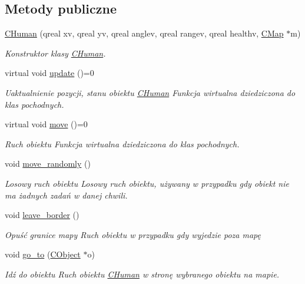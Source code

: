 \subsection*{Metody publiczne}
\begin{DoxyCompactItemize}
\item 
\mbox{\hyperlink{class_c_human_ac22428a4cdaa94ce6b238d690caa8406}{C\+Human}} (qreal xv, qreal yv, qreal anglev, qreal rangev, qreal healthv, \mbox{\hyperlink{class_c_map}{C\+Map}} $\ast$m)
\begin{DoxyCompactList}\small\item\em Konstruktor klasy \mbox{\hyperlink{class_c_human}{C\+Human}}. \end{DoxyCompactList}\item 
virtual void \mbox{\hyperlink{class_c_human_adb7f7d855ace82f7517bb49f465ea5d9}{update}} ()=0
\begin{DoxyCompactList}\small\item\em Uaktualnienie pozycji, stanu obiektu \mbox{\hyperlink{class_c_human}{C\+Human}} Funkcja wirtualna dziedziczona do klas pochodnych. \end{DoxyCompactList}\item 
virtual void \mbox{\hyperlink{class_c_human_af0a61dfcb43e2d094ab66b29735c4424}{move}} ()=0
\begin{DoxyCompactList}\small\item\em Ruch obiektu Funkcja wirtualna dziedziczona do klas pochodnych. \end{DoxyCompactList}\item 
void \mbox{\hyperlink{class_c_human_a3f334a1258957bac162181664212cfcf}{move\+\_\+randomly}} ()
\begin{DoxyCompactList}\small\item\em Losowy ruch obiektu Losowy ruch obiektu, używany w przypadku gdy obiekt nie ma żadnych zadań w danej chwili. \end{DoxyCompactList}\item 
void \mbox{\hyperlink{class_c_human_a57cd3a5b7922a03d67d4d04af355b332}{leave\+\_\+border}} ()
\begin{DoxyCompactList}\small\item\em Opuść granice mapy Ruch obiektu w przypadku gdy wyjedzie poza mapę \end{DoxyCompactList}\item 
void \mbox{\hyperlink{class_c_human_abb7c1d1fe27f3509364a9e727e315d74}{go\+\_\+to}} (\mbox{\hyperlink{class_c_object}{C\+Object}} $\ast$o)
\begin{DoxyCompactList}\small\item\em Idź do obiektu Ruch obiektu \mbox{\hyperlink{class_c_human}{C\+Human}} w stronę wybranego obiektu na mapie. \end{DoxyCompactList}\item 

\end{DoxyCompactItemize}
